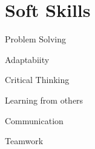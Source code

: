\documentclass{article}
\begin{document}
	\section*{Soft Skills \hrulefill\vspace{-.3\baselineskip}}
	\begin{inparaitem}[\hspace{1em}{\tiny\textbullet}]
			\hspace{-1em}\item Problem Solving
			\item Adaptabiity
			\item Critical Thinking
			\item Learning from others
			\item Communication
			\item Teamwork
		\end{inparaitem} \\	
	
	\hspace{-1.5em}\hrulefill
	
\end{document}
